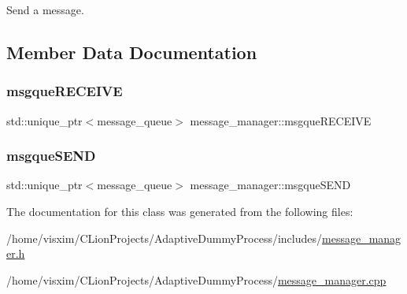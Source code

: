 Send a message. 



\subsection{Member Data Documentation}
\mbox{\label{classmessage__manager_a02b3ec0e7e4003a7f8483382e0b9d813}} 
\subsubsection{\texorpdfstring{msgque\+R\+E\+C\+E\+I\+VE}{msgqueRECEIVE}}
{\footnotesize\ttfamily std\+::unique\+\_\+ptr$<$message\+\_\+queue$>$ message\+\_\+manager\+::msgque\+R\+E\+C\+E\+I\+VE\hspace{0.3cm}{\ttfamily [private]}}

\mbox{\label{classmessage__manager_a587e012eba883e294532f4d28bd54a47}} 
\subsubsection{\texorpdfstring{msgque\+S\+E\+ND}{msgqueSEND}}
{\footnotesize\ttfamily std\+::unique\+\_\+ptr$<$message\+\_\+queue$>$ message\+\_\+manager\+::msgque\+S\+E\+ND\hspace{0.3cm}{\ttfamily [private]}}



The documentation for this class was generated from the following files\+:\begin{DoxyCompactItemize}
\item 
/home/visxim/\+C\+Lion\+Projects/\+Adaptive\+Dummy\+Process/includes/\hyperlink{message__manager_8h}{message\+\_\+manager.\+h}\item 
/home/visxim/\+C\+Lion\+Projects/\+Adaptive\+Dummy\+Process/\hyperlink{message__manager_8cpp}{message\+\_\+manager.\+cpp}\end{DoxyCompactItemize}
